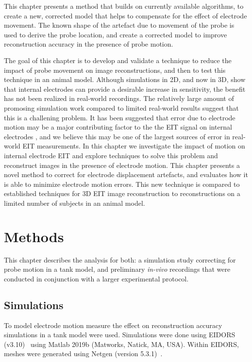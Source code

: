 This chapter presents a method that builds on currently available
algorithms, to create a new, corrected model
that helps to compensate for the effect of electrode movement.  
The known shape of the artefact due to movement of the probe is used to 
derive the probe location, and create a corrected model to improve 
reconstruction accuracy in the presence of probe motion.

The goal of this chapter is to develop and validate a technique to reduce the impact of probe movement on 
image reconstructions, and then to test this technique in an animal model. 
Although simulations in 2D, and now in 3D, show that internal electrodes can provide 
a desirable increase in sensitivity, the benefit has not been realized in real-world
recordings. 
The relatively large amount of promosing simulation work compared to limited real-world 
results suggest that this is a challening problem. 
It has been suggested that error due to electrode motion may be a major contributing 
factor to the the EIT signal on internal electrodes \parencite{nguyen_electrical_2020},
and we believe this may be one of the largest sources of error in real-world 
EIT measurements. 
In this chapter we investigate the impact of motion on internal electrode EIT and explore 
techniques to solve this problem and reconstruct images in the presence of electrode motion.
This chapter presents a novel method to correct for electrode displacement artefacts, and evaluates 
how it is able to minimize electrode motion errors.
This new technique is compared to 
established techniques for 3D EIT image reconstruction 
to reconstructions on a limited number of 
subjects in an animal model.

\section{Methods}
This chapter describes the analysis for both: a simulation study correcting for probe motion 
in a tank model, and preliminary \emph{in-vivo} recordings that were conducted 
in conjunction with a larger experimental protocol. 

\subsection{Simulations}
To model electrode motion measure the effect on reconstruction accuracy simulations 
in a tank model were used.
Simulations were done using EIDORS (v3.10)~\parencite{adler_eidors_2017}
using Matlab 2019b (Matworks, Natick, MA, USA).
Within EIDORS, meshes were generated using 
Netgen (version 5.3.1)~\parencite{schoberl_netgen_1997}.

